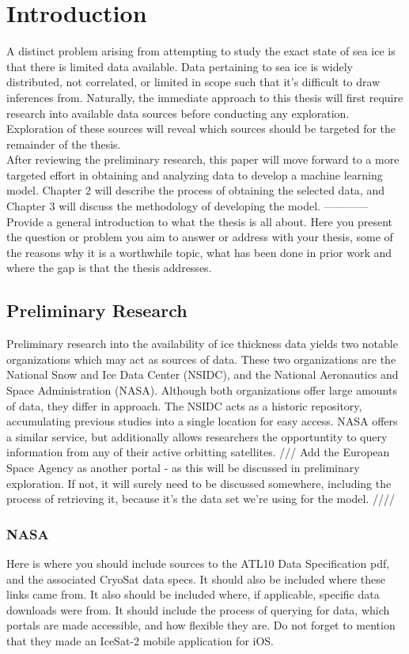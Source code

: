 \chapter{Introduction}
\label{sec:Introduction}

A distinct problem arising from attempting to study the exact state of sea ice is that there is limited data available. Data pertaining to sea ice is widely distributed, not correlated, or limited in scope such that it's difficult to draw inferences from. Naturally, the immediate approach to this thesis will first require research into available data sources before conducting any exploration. Exploration of these sources will reveal which sources should be targeted for the remainder of the thesis.
\\
\indent After reviewing the preliminary research, this paper will move forward to a more targeted effort in obtaining and analyzing data to develop a machine learning model. Chapter 2 will describe the process of obtaining the selected data, and Chapter 3 will discuss the methodology of developing the model.
------------
\\
Provide a general introduction to what the thesis is all about. Here you present the question or problem you aim to answer or address with your thesis, some of the reasons why it is a worthwhile topic, what has been done in prior work and where the gap is that the thesis addresses.

\section{Preliminary Research}
Preliminary research into the availability of ice thickness data yields two notable organizations which may act as sources of data. These two organizations are the National Snow and Ice Data Center (NSIDC), and the National Aeronautics and Space Administration (NASA). Although both organizations offer large amounts of data, they differ in approach. The NSIDC acts as a historic repository, accumulating previous studies into a single location for easy access. NASA offers a similar service, but additionally allows researchers the opportuntity to query information from any of their active orbitting satellites.
/// Add the European Space Agency as another portal - as this will be discussed in preliminary exploration. If not, it will surely need to be discussed somewhere, including the process of retrieving it, because it's the data set we're using for the model.  ////

\subsection*{NASA}
Here is where you should include sources to the ATL10 Data Specification pdf, and the associated CryoSat data specs. It should also be included where these links came from. It also should be included where, if applicable, specific data downloads were from. It should include the process of querying for data, which portals are made accessible, and how flexible they are. Do not forget to mention that they made an IceSat-2 mobile application for iOS.


